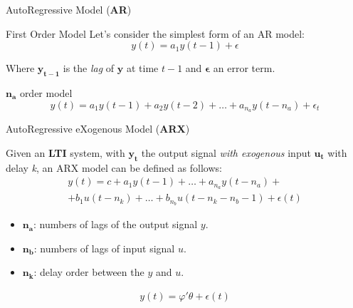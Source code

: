\documentclass[aspectratio=169,hyperref={pdfpagelabels=false}]{beamer}
\begin{document}
\begin{frame}{AutoRegressive Model (\textbf{AR})}
  \begin{block}{First Order Model}
    Let's consider the simplest form of an AR model:
    \begin{equation*}
      y(t) = a_1 y(t-1) + \epsilon
    \end{equation*}
  \end{block}
    Where $\bm{y_{t-1}}$ is the \textit{lag} of $\bm{y}$ at time $t-1$ and $\bm{\epsilon}$ an error term. 
    \begin{block}{$\bm{n_a}$ order model}
      \begin{equation*}
        y(t) = {a}_{1}y(t-1) + a_{2}y(t-2) + \dots + a_{n_a}y(t-n_a) + \epsilon_t
      \end{equation*}
    \end{block}
  \end{frame}

\begin{frame}{AutoRegressive eXogenous Model (\textbf{ARX})}
  \begin{block}{}
    Given an \textbf{LTI} system, with $\bm{y_t}$ the output signal \textit{with exogenous} input $\bm{u_t}$ with delay \textit{k}, an ARX model can be defined as follows:
    \begin{align*}
      y(t) = c + a_{1}y(t-1) + \dots + a_{n_a}y(t-n_a) + \\ 
              + b_{1}u(t-n_k) + \dots + b_{n_b}u(t-n_k-n_b-1) + \epsilon(t)      
    \end{align*}
    \begin{itemize}
      \item $\bm{n_a}$: numbers of lags of the output signal $y$.
      \item $\bm{n_b}$: numbers of lags of input signal $u$.
      \item $\bm{n_k}$: delay order between the $y$ and $u$.
    \end{itemize}
     
    \begin{align*}
      \boxed{y(t) = \varphi'\theta + \epsilon(t)}
    \end{align*}
  \end{block}
  \end{frame}
\end{document}
